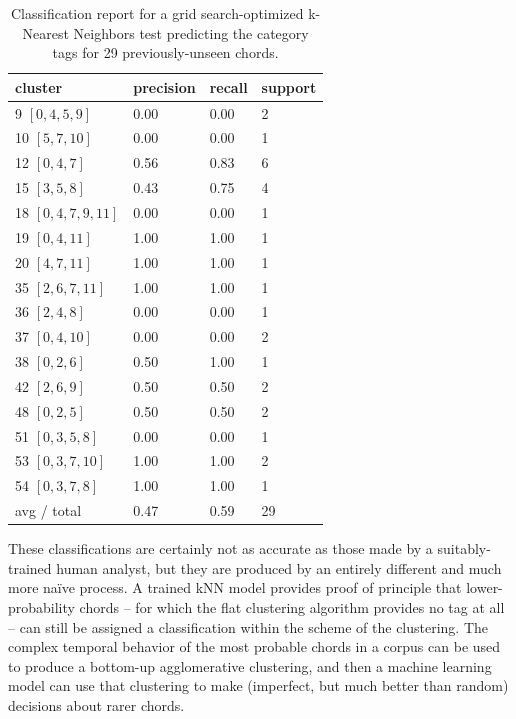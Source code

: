 \begin{table}%
  \caption{Classification report for a grid search-optimized k-Nearest Neighbors test predicting the category tags for 29 previously-unseen chords.}
  \centering
\begin{tabular}{l |l |l |l }
\hline\hline
cluster & precision	&  recall &  support \\ [0.5ex]
\hline
	 9 $[0,4,5,9]$	    &    0.00  &    0.00   &       2\\
	 10 $[5,7,10]$  	&    0.00  &    0.00   &       1\\
	 12 $[0,4,7]$		&    0.56  &    0.83   &       6\\
	 15 $[3,5,8]$ 		&    0.43  &    0.75   &       4\\
	 18 $[0,4,7,9,11]$  &    0.00  &    0.00   &       1\\
	 19 $[0,4,11]$		&    1.00  &    1.00   &       1\\
	 20 $[4,7,11]$		&    1.00  &    1.00   &       1\\
	 35 $[2,6,7,11]$	&    1.00  &    1.00   &       1\\
	 36 $[2,4,8]$		&    0.00  &    0.00   &       1\\
	 37 $[0,4,10]$	    &    0.00  &    0.00   &       2\\
	 38 $[0,2,6]$	    &    0.50  &    1.00   &       1\\
	 42 $[2,6,9]$	    &    0.50  &    0.50   &       2\\
	 48 $[0,2,5]$	    &    0.50  &    0.50   &       2\\
	 51 $[0,3,5,8]$	    &    0.00  &    0.00   &       1\\
	 53 $[0,3,7,10]$    &    1.00  &    1.00   &       2\\
	 54 $[0,3,7,8]$	    &    1.00  &    1.00   &       1\\
\hline
avg / total  &  0.47   &  0.59   &       29\\[1ex]
\hline
\end{tabular}
\label{class_report}
\end{table}

These classifications are certainly not as accurate as those made by a suitably-trained human analyst, but they are produced by an entirely different and much more na\"{i}ve process.  A trained kNN model provides proof of principle that lower-probability chords -- for which the flat clustering algorithm provides no tag at all -- can still be assigned a classification within the scheme of the clustering.  The complex temporal behavior of the most probable chords in a corpus can be used to produce a bottom-up agglomerative clustering, and then a machine learning model can use that clustering to make (imperfect, but much better than random) decisions about rarer chords.


